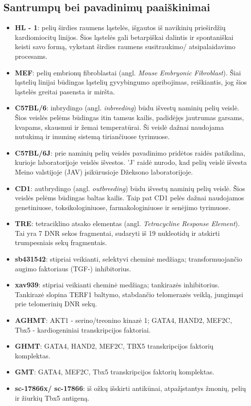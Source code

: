 \documentclass[12pt]{article}
\begin{document}
\newpage

\subsection{Santrumpų bei pavadinimų paaiškinimai}
\begin{itemize}
    \item \textbf{HL - 1}: pelių širdies raumens ląstelės, išgautos iš
        navikinių prieširdžių kardiomiocitų linijos. Šios ląstelės gali
        betarpiškai dalintis ir spontaniškai keisti savo formą, vykstant
        širdies raumens susitraukimo/ atsipalaidavimo procesams.
    \item \textbf{MEF}: pelių embrionų fibroblastai (angl. \emph{Mouse
        Embryonic Fibroblast}). Šiai ląstelių linijai būdingas ląstelių
        gyvybingumo apribojimas, reiškiantis, jog šios ląstelės greitai
        pasensta ir miršta.
    \item \textbf{C57BL/6}: inbrydingo (angl. \emph{inbreeding}) būdu išvestų
        naminių pelių veislė. Šios veislės pelėms būdingas itin tamsus
        kailis, padidėjęs jautrumas garsams, kvapams, skausmui ir žemai
        temperatūrai. Ši veislė dažnai naudojama nutukimą ir imuninę sistemą
        tiriančiuose tyrimuose.
    \item \textbf{C57BL/6J}: prie naminių pelių veislės pavadinimo pridėtos
        raidės patikslina, kurioje laboratorijoje veislės išvestos. 'J' raidė
        nurodo, kad pelių veislė išvesta Meino valstijoje (JAV) įsikūrusioje
        Džeksono laboratorijoje\cite{JCKSLAB}.
    \item \textbf{CD1}: autbrydingo (angl. \emph{outbreeding}) būdu išvestų
        naminių pelių veislė. Šios veislės pelėms būdingas baltas kailis.
        Taip pat CD1 pelės dažnai naudojamos genetiniuose, toksikologiniuose,
        farmakologiniuose ir senėjimo tyrimuose.
    \item \textbf{TRE}: tetraciklino atsako elementas (angl. \emph{Tetracycline
        Response Element}). Tai yra 7 DNR sekos fragmentai,
        sudaryti iš 19 nukleotidų ir atskirti trumpesniais sekų fragmentais.
    \item \textbf{sb431542}: stipriai veikianti, selektyvi cheminė medžiaga;
        transformuojančio augimo faktoriaus {\textbeta} (TGF-{\textbeta})
        inhibitorius.
    \item \textbf{xav939}: stipriai veikianti cheminė medžiaga; tankirazės
        inhibitorius. Tankirazė slopina TERF1 baltymo, stabdančio
        telomerazės veiklą, jungimąsi prie telomerinių DNR sekų.
    \item \textbf{AGHMT}: AKT1 - serino/treonino kinazė 1; GATA4, HAND2, MEF2C,
        Tbx5 - kardiogeniniai transkripcijos faktoriai.
    \item \textbf{GHMT}: GATA4, HAND2, MEF2C, TBX5 transkripcijos faktorių
        komplektas.
    \item \textbf{GMT}: GATA4, MEF2C, Tbx5 transkripcijos faktorių komplektas.
    \item \textbf{sc-17866x/ sc-17866}: iš ožkų išskirti antikūnai,
        atpažįstantys žmonių, pelių ir žiurkių Tbx5 antigeną.
\end{itemize}
\end{document}
